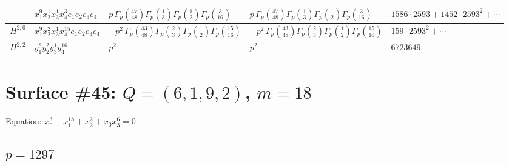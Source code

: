 \documentclass[11pt]{article}
\begin{document}
\begin{table}[ht]
{\begin{tabular}{@{}lllll@{}}
 & $x_{1}^{9} x_{2}^{1} x_{3}^{1} x_{4}^{3}  e_{1} e_{2} e_{3} e_{4}$ & $p \, \Gamma_p \left( \frac{47}{48} \right) \Gamma_p \left( \frac{1}{3} \right) \Gamma_p \left( \frac{1}{2} \right) \Gamma_p \left( \frac{3}{16} \right)$ & $p \, \Gamma_p \left( \frac{47}{48} \right) \Gamma_p \left( \frac{1}{3} \right) \Gamma_p \left( \frac{1}{2} \right) \Gamma_p \left( \frac{3}{16} \right)$ & $1586{\cdot}2593{+}1452{\cdot}2593^{2}{+}\cdots$ \\
\midrule
$H^{2,0}$ & $x_{1}^{9} x_{2}^{2} x_{3}^{1} x_{4}^{15}  e_{1} e_{2} e_{3} e_{4}$ & $- p^{2} \, \Gamma_p \left( \frac{43}{48} \right) \Gamma_p \left( \frac{2}{3} \right) \Gamma_p \left( \frac{1}{2} \right) \Gamma_p \left( \frac{15}{16} \right)$ & $- p^{2} \, \Gamma_p \left( \frac{43}{48} \right) \Gamma_p \left( \frac{2}{3} \right) \Gamma_p \left( \frac{1}{2} \right) \Gamma_p \left( \frac{15}{16} \right)$ & $159{\cdot}2593^{2}{+}\cdots$ \\
\midrule
$H^{2,2}$ & $y_{1}^{8} y_{2}^{2} y_{3}^{1} y_{4}^{16}$ & $p^{2} \,$ & $p^{2} \,$ & $6723649$ \\
\bottomrule
\end{tabular}
}
\renewcommand{\arraystretch}{1.0}
\end{table}

\newpage

\section*{Surface \#45: $Q=(6, 1, 9, 2)$, $m=18$}

Equation: $x_0^{3} + x_1^{18} + x_2^{2} + x_0 x_3^{6} = 0$

\subsection*{$p = 1297$}
\end{document}
